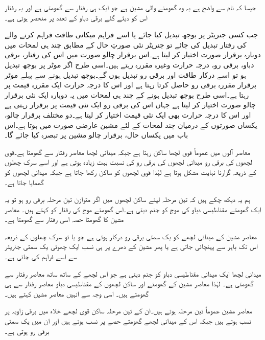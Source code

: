 جیسا کہ نام سے واضح ہے یہ وہ گھومنے والی مشین ہے جو ایک ہی رفتار سے گھومتی ہے اور یہ رفتار اس کو دیئے گئے برقی دباو کے تعدد پر منحصر ہوتی ہے۔

جب کسی جنریٹر پر بوجھ تبدیل کیا جائے یا اسے فراہم میکانی طاقت فراہم کرنے والے کی رفتار تبدیل کی جائے تو جنریٹر نئی صورتِ حال کے  مطابق چند ہی لمحات میں دوبارہ برقرار  صورت اختیار کر لیتا ہے۔اس برقرار چالو صورت میں اس کی رفتار، برقی دباو، برقی رو، درجہ حرارت وغیرہ  مقررہ رہتے ہیں۔اسی طرح اگر موٹر پر بوجھ تبدیل ہو تو اسے درکار طاقت اور برقی رو تبدیل ہوں گے۔بوجھ تبدیل ہونے سے پہلے موٹر برقرار مقررہ برقی رو حاصل کرتا رہتا ہے اور اس کا درجہ حرارت ایک مقررہ قیمت پر رہتا ہے۔اسی طرح بوجھ تبدیل ہونے کے چند ہی لمحات میں یہ دوبارہ ایک نئی برقرار چالو صورت اختیار کر لیتا ہے جہاں اس کی برقی رو ایک نئی قیمت پر برقرار رہتی ہے اور اس کا درجہ حرارت بھی ایک نئی قیمت اختیار کر لیتا ہے۔دو مختلف برقرار چالو، یکساں صورتوں کے درمیان چند لمحات کے لئے مشین عارضی صورت میں ہوتا ہے۔اس باب میں یکساں حال، برقرار چالو مشین پر تبصرہ کیا جائے گا۔ 

معاصر آلوں میں عموماً قوی لچھا ساکن رہتا ہے جبکہ میدانی لچھا معاصر رفتار سے گھومتا ہے۔قوی لچھوں کی برقی رو میدانی لچھوں کی برقی رو کی نسبت بہت زیادہ ہوتی ہے اور اسے سرک چھلوں کے ذریعہ گزارنا نہایت مشکل ہوتا ہے لہٰذا قوی لچھوں کو ساکن رکھا جاتا ہے جبکہ میدانی لچھوں کو گھمایا جاتا ہے۔

 ہم یہ دیکھ چکے ہیں کہ تین مرحلہ  لپٹے ساکن لچھوں میں اگر متوازن تین مرحلہ برقی رو ہو تو یہ ایک گھومتے مقناطیسی دباو کی موج کو جنم دیتی ہے۔اس گھومتے موج کی رفتار کو   کہتے ہیں۔ معاصر مشین کا گھومتا حصہ اسی رفتار سے گھومتا ہے۔ 

معاصر مشین کے میدانی لچھے کو یک سمتی برقی رو درکار ہوتی ہے جو یا تو سرک چھلوں کے ذریعہ اس تک باہر سے پہنچائی جاتی ہے یا پھر مشین کے دھرے پر ہی نسب ایک چھوٹی یک سمتی جنریٹر سے اسے فراہم کی جاتی ہے۔

میدانی لچھا ایک میدانی مقناطیسی دباو کو جنم دیتی ہے جو اس لچھے کے ساتھ ساتھ معاصر رفتار سے گھومتی ہے۔ لہٰذا معاصر مشین کے گھومتے اور ساکن لچھوں کے مقناطیسی دباو معاصر رفتار سے ہی گھومتے ہیں۔ اسی وجہ سے انہیں معاصر مشین کہتے ہیں۔

معاصر مشین عموماً تین مرحلہ ہوتے ہیں۔ان کے تین مرحلہ ساکن قوی لچھے خلاء میں   برقی زاویہ پر نسب ہوتے ہیں جبکہ اس کے میدانی لچھے گھومتے حصے پر نسب ہوتے ہیں اور ان میں یک سمتی برقی رو ہوتی ہے۔ 


